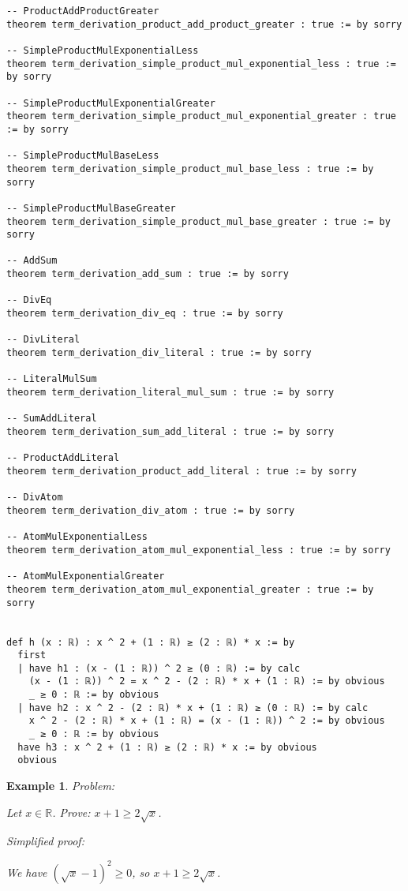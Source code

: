 \documentclass{article}
\newtheorem{example}{Example}
\begin{document}
\begin{tcolorbox}[colback=white!10, width=\linewidth]
\begin{lstlisting}[language=Lean4]
-- ProductAddProductGreater
theorem term_derivation_product_add_product_greater : true := by sorry

-- SimpleProductMulExponentialLess
theorem term_derivation_simple_product_mul_exponential_less : true := by sorry

-- SimpleProductMulExponentialGreater
theorem term_derivation_simple_product_mul_exponential_greater : true := by sorry

-- SimpleProductMulBaseLess
theorem term_derivation_simple_product_mul_base_less : true := by sorry

-- SimpleProductMulBaseGreater
theorem term_derivation_simple_product_mul_base_greater : true := by sorry

-- AddSum
theorem term_derivation_add_sum : true := by sorry

-- DivEq
theorem term_derivation_div_eq : true := by sorry

-- DivLiteral
theorem term_derivation_div_literal : true := by sorry

-- LiteralMulSum
theorem term_derivation_literal_mul_sum : true := by sorry

-- SumAddLiteral
theorem term_derivation_sum_add_literal : true := by sorry

-- ProductAddLiteral
theorem term_derivation_product_add_literal : true := by sorry

-- DivAtom
theorem term_derivation_div_atom : true := by sorry

-- AtomMulExponentialLess
theorem term_derivation_atom_mul_exponential_less : true := by sorry

-- AtomMulExponentialGreater
theorem term_derivation_atom_mul_exponential_greater : true := by sorry


def h (x : ℝ) : x ^ 2 + (1 : ℝ) ≥ (2 : ℝ) * x := by
  first
  | have h1 : (x - (1 : ℝ)) ^ 2 ≥ (0 : ℝ) := by calc
    (x - (1 : ℝ)) ^ 2 = x ^ 2 - (2 : ℝ) * x + (1 : ℝ) := by obvious
    _ ≥ 0 : ℝ := by obvious
  | have h2 : x ^ 2 - (2 : ℝ) * x + (1 : ℝ) ≥ (0 : ℝ) := by calc
    x ^ 2 - (2 : ℝ) * x + (1 : ℝ) = (x - (1 : ℝ)) ^ 2 := by obvious
    _ ≥ 0 : ℝ := by obvious
  have h3 : x ^ 2 + (1 : ℝ) ≥ (2 : ℝ) * x := by obvious
  obvious

\end{lstlisting}
\end{tcolorbox}


\begin{example}
Problem:
\begin{tcolorbox}[colback=yellow!10, width=\linewidth]
Let $x\in\mathbb{R}$. Prove: $x + 1 \ge 2\sqrt{x}$.
\end{tcolorbox}

Simplified proof:
\begin{tcolorbox}[colback=blue!10, width=\linewidth]
We have $(\sqrt{x}-1)^2 \ge 0$, so $x+1 \ge 2\sqrt{x}$.
\end{tcolorbox}
\end{example}
\end{document}
